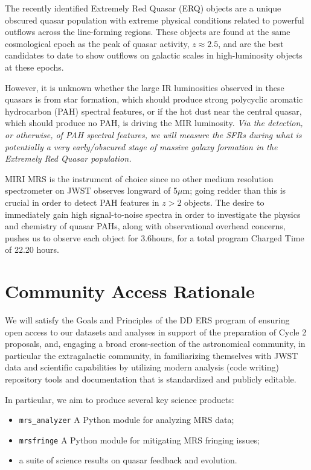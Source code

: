 \smallskip \smallskip
\noindent
The recently identified Extremely Red Quasar (ERQ) objects are a
unique obscured quasar population with extreme physical conditions
related to powerful outflows across the line-forming regions. These
objects are found at the same cosmological epoch as the peak of quasar
activity, $z\approx2.5$, and are the best candidates to date to show
outflows on galactic scales in high-luminosity objects at these epochs. 

\smallskip \smallskip
\noindent
However, it is unknown whether the large IR luminosities observed in 
these quasars is from star formation, which should produce strong 
polycyclic aromatic hydrocarbon (PAH) spectral features, 
or if the hot dust near the central quasar, which should produce no PAH, 
is driving the MIR luminosity. 
{\it Via the detection, or otherwise, of PAH spectral features, we will 
measure the SFRs during what is potentially a very early/obscured stage 
of massive galaxy formation in the Extremely Red Quasar population.}

\smallskip \smallskip
\noindent
MIRI MRS is the instrument of choice since no other medium resolution
spectrometer on JWST observes longward of 5$\mu$m; going redder than
this is crucial in order to detect PAH features in $z>2$ objects.  The
desire to immediately gain high signal-to-noise spectra in order to
investigate the physics and chemistry of quasar PAHs, along with
observational overhead concerns, pushes us to observe each object for
3.6hours, for a total program Charged Time of 22.20 hours.



\section*{Community Access Rationale}
\vspace{-6pt}
\noindent
We will satisfy the Goals and Principles of the DD ERS program of
ensuring open access to our datasets and analyses in support of the
preparation of Cycle 2 proposals, and, engaging a broad cross-section
of the astronomical community, in particular the extragalactic
community, in familiarizing themselves with JWST data and scientific
capabilities by utilizing modern analysis (code writing) repository
tools and documentation that is standardized and publicly editable.

\noindent
In particular, we aim to produce several key science products:
\begin{itemize}
\item {\tt mrs\_analyzer} A Python module for analyzing MRS data; 
\item {\tt mrsfringe} A Python module for mitigating MRS fringing issues; 
\item a suite of science results on quasar feedback and evolution. 
\end{itemize}

